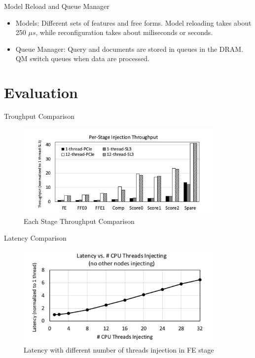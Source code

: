 \documentclass[t]{beamer}
\begin{document}
\begin{frame}{Model Reload and Queue Manager}
    \begin{itemize}
        \item Models: Different sets of features and free forms. Model reloading takes about 250 $\mu
        s$, while reconfiguration takes about miliseconds or seconds.
        \item Queue Manager: Query and documents are stored in queues in the DRAM. QM switch queues when
        data are processed.
    \end{itemize}
\end{frame}

\section{Evaluation}

\begin{frame}{Troughput Comparison}
    \begin{figure}
        \includegraphics[width=4in]{img/throughput-comparison.png}
        \caption{Each Stage Throughput Comparison}
    \end{figure}
\end{frame}

\begin{frame}{Latency Comparison}
    \begin{figure}
        \includegraphics[width=4in]{img/latency-cpu-fe.png}
        \caption{Latency with different number of threads injection in FE stage}
    \end{figure}
\end{frame}
\end{document}
